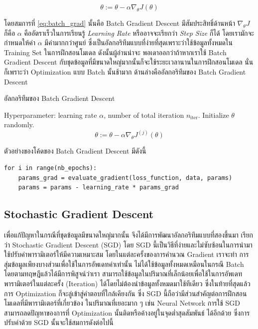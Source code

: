 \begin{equation}\label{eq:batch_grad}
    \theta := \theta - \alpha\nabla_\theta J(\theta)
\end{equation}

\noindent โดยสมการที่ \ref{eq:batch_grad} นั้นคือ Batch Gradient Descent มีสัมประสิทธิ์ด้านหน้า $\nabla_\theta J$ ก็คือ 
$\alpha$ คืออัตราเร็วในการเรียนรู้ \textit{Learning Rate} หรืออาจจะเรียกว่า \textit{Step Size} ก็ได้ โดยเรามักจะกำหนดให้ค่า 
$\alpha$ มีค่ามากกว่าศูนย์ ซึ่งเป็นอัลกอริทึมแบบที่ง่ายที่สุดเพราะว่าใช้ข้อมูลทั้งหมดใน Training Set ในการฝึกสอนโมเดล ดังนั้นผู้อ่านน่าจะ%
พอเดาออกว่าถ้าหากเราใช้ Batch Gradient Descent กับชุดข้อมูลที่มีขนาดใหญ่มากนั้นก็จะใช้ระยะเวลานานในการฝึกสอนโมเดล นั่นก็เพราะว่า 
Optimization แบบ Batch นั้นช้ามาก ด้านล่างคืออัลกอริทึมของ Batch Gradient Descent

\begin{algorithm}[H]
    \caption{อัลกอริทึมของ Batch Gradient Descent}
    \label{alg:batch_grad}
    \begin{algorithmic}
    \State Hyperparameter: learning rate $\alpha$, number of total iteration $n_\text{iter}$.
    \State Initialize $\theta$ randomly.
        \begin{equation*}
            \theta := \theta - \alpha\nabla_\theta J^{(j)}(\theta)
        \end{equation*}
    \EndFor
    \end{algorithmic}
\end{algorithm}

\noindent ตัวอย่างของโค้ดของ Batch Gradient Descent มีดังนี้

\begin{lstlisting}[style=MyPython]
for i in range(nb_epochs):
    params_grad = evaluate_gradient(loss_function, data, params)
    params = params - learning_rate * params_grad
\end{lstlisting}

\subsection{Stochastic Gradient Descent}
\label{ssec:stochastic_grad}

เพื่อแก้ปัญหาในกรณีที่ชุดข้อมูลมีขนาดใหญ่มากนั้น จึงได้มีการพัฒนาอัลกอริทึมแบบที่สองขึ้นมา เรียกว่า Stochastic Gradient Descent (SGD) 
โดย SGD นี้เป็นวิธีที่ง่ายและไม่ซับซ้อนในการนำมาใช้ปรับค่าพารามิเตอร์ให้มีความเหมาะสม โดยในแต่ละครั้งของการคำนวณ Gradient เราจะทำ%
การสุ่มข้อมูลเพียงบางส่วนเพื่อใช้ในการอัพเดทค่าเท่านั้น ไม่ได้ใช้ข้อมูลทั้งหมดเหมือนในกรณี Batch โดยตามทฤษฎีแล้วได้มีการพิสูจน์ว่าเรา%
สามารถใช้ข้อมูลในปริมาณที่เล็กน้อยเพื่อใช้ในการอัพเดทพารามิเตอร์ในแต่ละครั้ง (Iteration) ได้โดยไม่ต้องนำข้อมูลทั้งหมดมาใช้ทีเดียว 
ซึ่งในท้ายที่สุดแล้วการ Optimization ก็จะลู่เข้าสู่คำตอบที่ใกล้เคียงกัน ซึ่ง SGD นี้ถือว่ามีส่วนสำคัญต่อการฝึกสอนโมเดลที่มีพารามิเตอร์ที่เกี่ยวข้อง%
ในปริมาณที่เยอะมาก ๆ เช่น Neural Network การใช้ SGD สามารถลดปัญหาของการที่ Optimization นั้นติดหรือค้างอยู่ในจุดต่ำสุดสัมพันธ์%
ได้อีกด้วย ซึ่งการปรับค่าด้วย SGD นั้นจะใช้สมการดังต่อไปนี้

